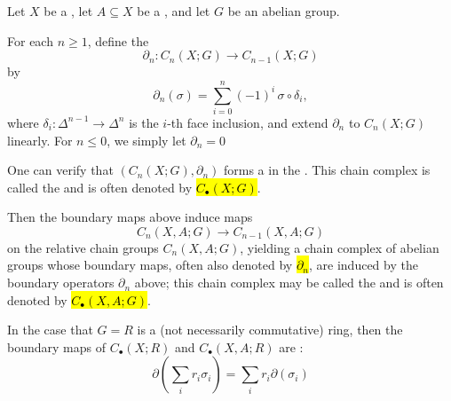 \begin{definition} \label{definition:singular_chain_complex_of_a_topological_space_with_coefficients_in_an_abelian_group}
Let $X$ be a , let $A \subseteq X$ be a , and let $G$ be an abelian group. 

For each $n \ge 1$, define the 
$$\partial_n : C_n(X;G) \to C_{n-1}(X;G)$$
 by
$$\partial_n(\sigma) = \sum_{i=0}^n (-1)^i\, \sigma \circ \delta_i,$$
where $\delta_i : \Delta^{n-1} \to \Delta^n$ is the $i$-th face inclusion, and extend $\partial_n$ to $C_n(X;G)$ linearly. For $n \leq 0$, we simply let $\partial_n = 0$

One can verify that $(C_n(X;G), \partial_n)$ forms a  in the  . This chain complex is called the  and is often denoted by \hl{$C_\bullet(X;G)$}.
 
Then the boundary maps above induce maps 
$$C_n(X,A;G) \to C_{n-1}(X,A;G)$$
on the relative chain groups $C_n(X,A;G)$, yielding a chain complex of abelian groups whose boundary maps, often also denoted by \hl{$\partial_n$}, are induced by the boundary operators $\partial_n$ above; this chain complex may be called the  and is often denoted by \hl{$C_\bullet(X,A;G)$}.

In the case that $G = R$ is a (not necessarily commutative) ring, then the boundary maps of $C_\bullet(X;R)$ and $C_\bullet(X,A;R)$ are :
$$\partial \left( \sum_i r_i\sigma_i \right) = \sum_i r_i \partial(\sigma_i)$$
\end{definition}